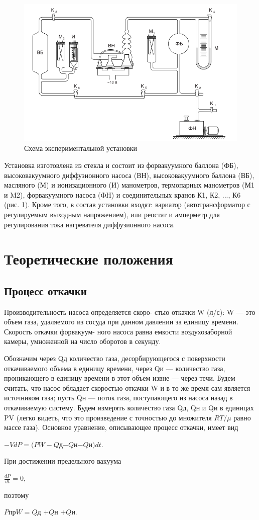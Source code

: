 \documentclass[a4paper]{article}
\begin{document}
\begin{figure}[h]
    \centering
    \includegraphics[width=\textwidth]{setup.PNG}
    \caption{Схема экспериментальной установки}
    \label{fig:vac}
\end{figure}

Установка изготовлена из стекла и состоит из форвакуумного баллона (ФБ), высоковакуумного диффузионного насоса (ВН), высоковакуумного баллона (ВБ), масляного (М) и ионизационного (И) манометров, термопарных манометров (М1 и M2), форвакуумного насоса (ФН) и соединительных кранов
К1, К2, ..., К6 (рис. 1). Кроме того, в состав установки входят: вариатор
(автотрансформатор с регулируемым выходным напряжением), или реостат
и амперметр для регулирования тока нагревателя диффузионного насоса.

\section{Теоретические положения}
\subsection{Процесс откачки}
Производительность насоса определяется скоро-
стью откачки W (л/с): W — это объем газа, удаляемого из сосуда при
данном давлении за единицу времени. Скорость откачки форвакуум-
ного насоса равна емкости воздухозаборной камеры, умноженной на
число оборотов в секунду. \par
Обозначим через Qд количество газа, десорбирующегося с поверхности откачиваемого объема в единицу времени, через Qи — количество газа, проникающего в единицу времени в этот объем извне — через течи. Будем считать, что насос обладает скоростью откачки W и в то же время сам является источником газа; пусть Qн — поток газа, поступающего из насоса
назад в откачиваемую систему. Будем измерять количество газа Qд, Qн и Qи в единицах PV (легко видеть, что это произведение с точностью до множителя $RT/\mu$ равно массе газа). Основное уравнение, описывающее процесс откачки, имеет вид
\begin{center}
$−VdP = (PW - Q$д$ - Q$н$ - Q$и$)dt$.
\end{center}
При достижении предельного вакуума 
\begin{center}
$\frac{dP}{dt}=0$,
\end{center}
поэтому
\begin{center}
$P$пр$W =Q$д $ + Q$н $ + Q$и.
\end{center}
\end{document}
